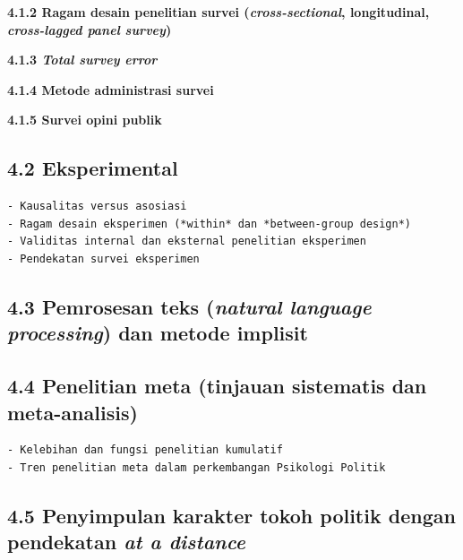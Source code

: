 \documentclass[
  english,
  man]{apa6}
\begin{document}
\textbf{4.1.2 Ragam desain penelitian survei (\emph{cross-sectional}, longitudinal, \emph{cross-lagged panel survey})}

\textbf{4.1.3 \emph{Total survey error}}

\textbf{4.1.4 Metode administrasi survei}

\textbf{4.1.5 Survei opini publik}

\hypertarget{eksperimental}{%
\subsection{4.2 Eksperimental}\label{eksperimental}}

\begin{verbatim}
- Kausalitas versus asosiasi
- Ragam desain eksperimen (*within* dan *between-group design*)
- Validitas internal dan eksternal penelitian eksperimen
- Pendekatan survei eksperimen
\end{verbatim}

\hypertarget{pemrosesan-teks-natural-language-processing-dan-metode-implisit}{%
\subsection{\texorpdfstring{4.3 Pemrosesan teks (\emph{natural language processing}) dan metode implisit}{4.3 Pemrosesan teks (natural language processing) dan metode implisit}}\label{pemrosesan-teks-natural-language-processing-dan-metode-implisit}}

\hypertarget{penelitian-meta-tinjauan-sistematis-dan-meta-analisis}{%
\subsection{4.4 Penelitian meta (tinjauan sistematis dan meta-analisis)}\label{penelitian-meta-tinjauan-sistematis-dan-meta-analisis}}

\begin{verbatim}
- Kelebihan dan fungsi penelitian kumulatif
- Tren penelitian meta dalam perkembangan Psikologi Politik
\end{verbatim}

\hypertarget{penyimpulan-karakter-tokoh-politik-dengan-pendekatan-at-a-distance}{%
\subsection{\texorpdfstring{4.5 Penyimpulan karakter tokoh politik dengan pendekatan \emph{at a distance}}{4.5 Penyimpulan karakter tokoh politik dengan pendekatan at a distance}}\label{penyimpulan-karakter-tokoh-politik-dengan-pendekatan-at-a-distance}}
\end{document}
